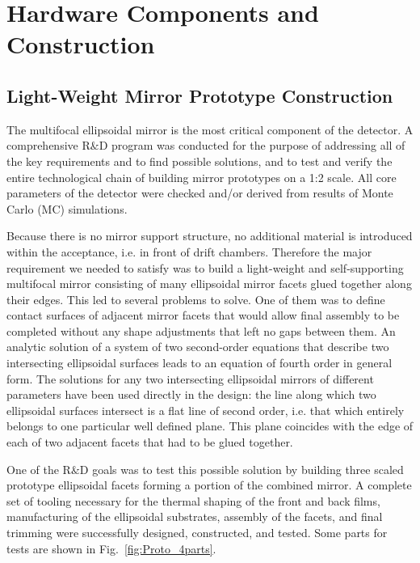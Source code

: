 \section{Hardware Components and Construction}

\subsection{Light-Weight Mirror Prototype Construction}

The multifocal ellipsoidal mirror is the most critical component of the detector. A comprehensive R$\&$D program
was conducted for the purpose of addressing all of the key requirements and to find possible solutions, and to test
and verify the entire technological chain of building mirror prototypes on a 1:2 scale. All core parameters of the
detector were checked and/or derived from results of Monte Carlo (MC) simulations.

Because there is no mirror support structure, no additional material is introduced  within the acceptance, i.e. in
front of drift chambers. Therefore the major requirement we needed to satisfy was to build a light-weight and
self-supporting multifocal mirror consisting of many ellipsoidal mirror facets glued together along their edges. This
led to several problems to solve. One of them was to define contact surfaces of adjacent mirror facets that would
allow final assembly to be completed without any shape adjustments that left no gaps between them. An analytic
solution of a system of two second-order equations that describe two intersecting ellipsoidal surfaces leads to an
equation of fourth order in general form. The solutions for any two intersecting ellipsoidal mirrors of different
parameters have been used directly in the design: the line along which two ellipsoidal surfaces intersect is a flat
line of second order, i.e. that which entirely belongs to one particular well defined plane. This plane coincides with
the edge of each of two adjacent facets that had to be glued together.

One of the R$\&$D goals was to test this possible solution by building three scaled prototype ellipsoidal facets
forming a portion of the combined mirror. A complete set of tooling necessary for the thermal shaping of the
front and back films, manufacturing of the ellipsoidal substrates, assembly of the facets, and final trimming were
successfully designed, constructed, and tested. Some parts for tests are shown in Fig.~\ref{fig:Proto_4parts}.

